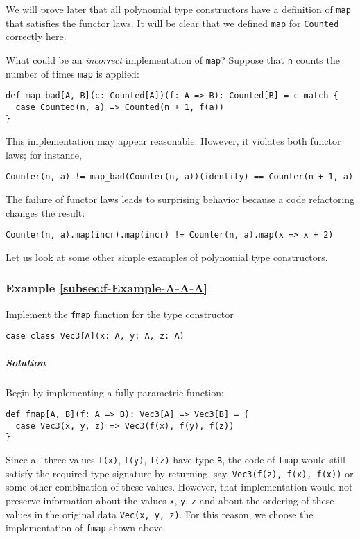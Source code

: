 We will prove later that all polynomial type constructors have a definition
of \lstinline!map! that satisfies the functor laws. It will be clear
that we defined \lstinline!map! for \lstinline!Counted! correctly
here. 

What could be an \emph{incorrect} implementation of \lstinline!map!?
Suppose that \lstinline!n! counts the number of times \lstinline!map!
is applied:
\begin{lstlisting}
def map_bad[A, B](c: Counted[A])(f: A => B): Counted[B] = c match {
  case Counted(n, a) => Counted(n + 1, f(a))
}
\end{lstlisting}
This implementation may appear reasonable. However, it violates both
functor laws; for instance,
\begin{lstlisting}
Counter(n, a) != map_bad(Counter(n, a))(identity) == Counter(n + 1, a)
\end{lstlisting}
The failure of functor laws leads to surprising behavior because a
code refactoring changes the result:
\begin{lstlisting}
Counter(n, a).map(incr).map(incr) != Counter(n, a).map(x => x + 2)
\end{lstlisting}

Let us look at some other simple examples of polynomial type constructors.

\subsubsection{Example \label{subsec:f-Example-A-A-A}\ref{subsec:f-Example-A-A-A}}

Implement the \lstinline!fmap! function for the type constructor
\begin{lstlisting}
case class Vec3[A](x: A, y: A, z: A)
\end{lstlisting}


\subparagraph{Solution}

Begin by implementing a fully parametric function:
\begin{lstlisting}
def fmap[A, B](f: A => B): Vec3[A] => Vec3[B] = {
  case Vec3(x, y, z) => Vec3(f(x), f(y), f(z))
}
\end{lstlisting}
Since all three values \lstinline!f(x)!, \lstinline!f(y)!, \lstinline!f(z)!
have type \lstinline!B!, the code of \lstinline!fmap! would still
satisfy the required type signature by returning, say, \lstinline!Vec3(f(z), f(x), f(x))!
or some other combination of these values. However, that implementation
would not preserve information about the values \lstinline!x!, \lstinline!y!,
\lstinline!z! and about the ordering of these values in the original
data \lstinline!Vec(x, y, z)!. For this reason, we choose the implementation
of \lstinline!fmap! shown above.

